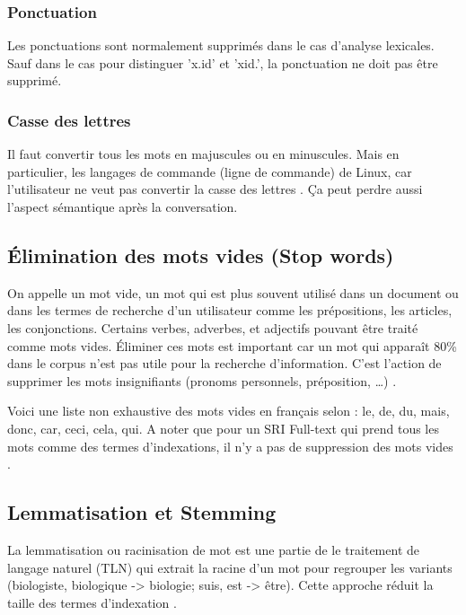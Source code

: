 \subsubsection{Ponctuation}
Les ponctuations sont normalement supprimés dans le cas d'analyse lexicales. Sauf dans le cas pour distinguer 'x.id' et 'xid.', la ponctuation ne doit pas être supprimé. \citep{modern-ir}

\subsubsection{Casse des lettres}
Il faut convertir tous les mots en majuscules ou en minuscules. Mais en particulier, les langages de commande (ligne de commande) de Linux, car l'utilisateur ne veut pas convertir la casse des lettres \citep{modern-ir}. Ça peut perdre aussi l'aspect sémantique après la conversation.

\subsection{Élimination des mots vides (Stop words)}
On appelle un mot vide, un mot qui est plus souvent utilisé dans un document ou dans les termes de recherche d'un utilisateur comme les prépositions, les articles, les conjonctions. Certains verbes, adverbes, et adjectifs pouvant être traité comme mots vides. Éliminer ces mots est important car un mot qui apparaît 80\% dans le corpus n'est pas utile pour la recherche d'information. C'est l'action de supprimer les mots insignifiants (pronoms personnels, préposition, \dots) \citep*{modern-ir, approche-semantique, sarch-engine-vsm}.

Voici une liste non exhaustive des mots vides en français selon \citep{stopwords_french}: le, de, du, mais, donc, car, ceci, cela, qui. A noter que pour un SRI Full-text qui prend tous les mots comme des termes d'indexations, il n'y a pas de suppression des mots vides \citep{modern-ir}.

\subsection{Lemmatisation et Stemming}
La lemmatisation ou racinisation de mot est une partie de le traitement de langage naturel (TLN) qui extrait la racine d'un mot pour regrouper les variants (biologiste, biologique -> biologie; suis, est -> être). Cette approche réduit la taille des termes d'indexation \citep*{approche-semantique, sarch-engine-vsm}.

